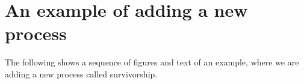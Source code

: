 \section{An example of adding a new process\label{sec:example}}
The following shows a sequence of figures and text of an example, where we are adding a new process called survivorship.